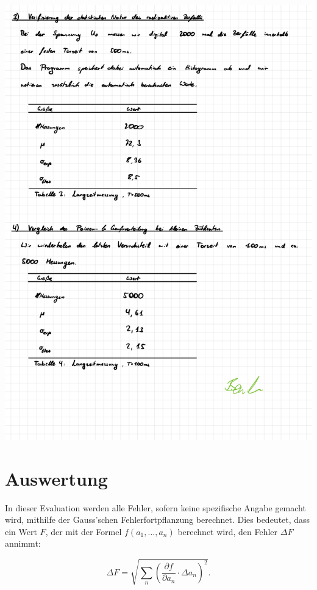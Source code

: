 \documentclass{article}
\begin{document}
\includegraphics[width=\textwidth]{graphics/mess4.jpg}
\newpage

\addtocounter{table}{4}




\clearpage
\newpage
\section{Auswertung}

In dieser Evaluation werden alle Fehler, sofern keine spezifische Angabe gemacht wird, mithilfe der Gauss'schen Fehlerfortpflanzung berechnet. Dies bedeutet, dass ein Wert $F$, der mit der Formel $f(a_1, ..., a_n)$ berechnet wird, den Fehler $\Delta F$ annimmt:

\begin{equation}
    \Delta F = \sqrt{\sum_n \left( \frac{\partial f}{\partial a_n} \cdot \Delta a_n \right)^2}.
\end{equation}
\end{document}
